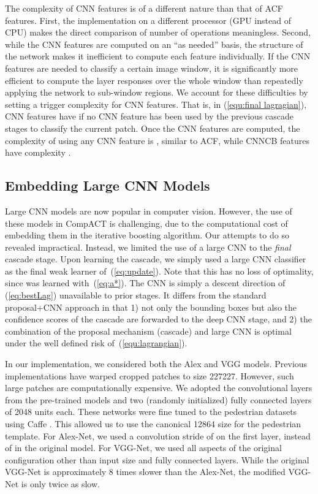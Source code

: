 \documentclass[10pt,twocolumn,letterpaper]{article}
\begin{document}
The complexity of CNN features is of a different nature than that of
ACF features. First, the implementation on a different
processor (GPU instead of CPU) makes the direct comparison of
number of operations meaningless. Second, while the CNN features
are computed on an ``as needed'' basis, the structure of the
network makes it inefficient to compute each feature individually.
If the CNN features are needed to classify a certain image window,
it is significantly more efficient to compute the  layer
responses over the whole window than repeatedly applying the
network to sub-window regions. We account for these difficulties
by setting a trigger complexity  for
CNN features. That is, in (\ref{equ:final lagragian}),
CNN features have  if no CNN feature has been used
by the previous cascade stages to classify the current patch. Once
the CNN features are
computed, the complexity of using any CNN feature is , similar to ACF,
while CNNCB features have complexity .


\subsection{Embedding Large CNN Models}
\label{subsec:big cnn}

Large CNN models \cite{DBLP:conf/nips/KrizhevskySH12,
DBLP:journals/corr/SimonyanZ14a} are now popular in computer vision. However,
the use of these models in CompACT is challenging,
due to the computational cost of embedding them in the iterative boosting
algorithm. Our attempts to do so revealed impractical.
Instead, we limited the use of a large CNN
to the {\it final\/} cascade stage. Upon learning the cascade, we
simply used a large CNN classifier as the final weak learner 
of~(\ref{eq:update}). Note that this has no
loss of optimality, since  was learned
with~(\ref{eq:a*}). The CNN is simply a descent direction of
(\ref{eq:bestLag}) unavailable to prior stages.
It differs from the standard proposal+CNN approach in that
1) not only the bounding boxes but also the confidence scores of the cascade
are forwarded to the deep CNN stage, and 2) the combination of the
proposal mechanism (cascade) and large CNN is optimal under the
well defined risk of~(\ref{equ:lagrangian}).

In our implementation, we considered both the
Alex \cite{DBLP:conf/nips/KrizhevskySH12} and
VGG \cite{DBLP:journals/corr/SimonyanZ14a} models. Previous
implementations \cite{DBLP:conf/cvpr/GirshickDDM14,
DBLP:journals/corr/HosangOBS15} have warped cropped patches to size
227227. However, such large patches are computationally expensive.
We adopted the convolutional layers from the pre-trained models and two
(randomly initialized) fully connected layers of 2048 units each.
These networks were fine tuned to the pedestrian datasets using
Caffe \cite{DBLP:conf/mm/JiaSDKLGGD14}. This
allowed us to use the canonical 12864 size for the pedestrian
template. For Alex-Net, we used a convolution stride of  on the
first layer, instead of  in the original model. For VGG-Net, we used
all aspects of the original configuration other than input size and fully
connected layers. While the original VGG-Net is approximately
8 times slower than the Alex-Net, the modified VGG-Net is only twice as
slow.
\end{document}

